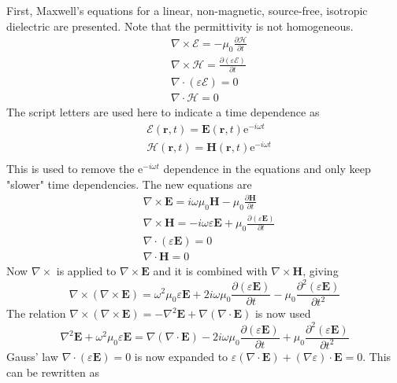 \documentclass[10pt,a4paper,draft]{scrartcl}
\begin{document}
	First, Maxwell's equations for a linear, non-magnetic, source-free, isotropic dielectric are presented. Note that the permittivity is not homogeneous.
	\begin{align*}
		&\nabla \times \bm{\mathcal{E}} = -\mu_0 \frac{\partial \bm{\mathcal{H}}}{\partial t} \\
		&\nabla \times \bm{\mathcal{H}} = \frac{\partial (\varepsilon \bm{\mathcal{E}})}{\partial t} \\
		&\nabla \cdot (\varepsilon \bm{\mathcal{E}}) = 0 \\
		&\nabla \cdot \bm{\mathcal{H}} = 0
	\end{align*}
	The script letters are used here to indicate a time dependence as
	\begin{align*}
		&\bm{\mathcal{E}}(\bm{r},t) = \bm{E}(\bm{r},t) \text{e}^{-i\omega t} \\
		&\bm{\mathcal{H}}(\bm{r},t) = \bm{H}(\bm{r},t) \text{e}^{-i\omega t} \\
	\end{align*}
	This is used to remove the e$^{-i\omega t}$ dependence in the equations and only keep "slower" time dependencies. The new equations are
	\begin{align*}
		&\nabla \times \bm{E} = i\omega \mu_0 \bm{H} - \mu_0 \frac{\partial \bm{H}}{\partial t} \\
		&\nabla \times \bm{H} = -i\omega \varepsilon \bm{E} + \mu_0 \frac{\partial (\varepsilon \bm{E})}{\partial t} \\
		&\nabla \cdot (\varepsilon \bm{E}) = 0 \\
		&\nabla \cdot \bm{H} = 0
	\end{align*}
	Now $\nabla \times$ is applied to $\nabla \times \bm{E}$ and it is combined with $\nabla \times \bm{H}$, giving
	\begin{equation*}
		\nabla \times (\nabla \times \bm{E}) = \omega^2 \mu_0 \varepsilon \bm{E} + 2i\omega \mu_0 \frac{\partial (\varepsilon \bm{E})}{\partial t} - \mu_0 \frac{\partial^2 (\varepsilon \bm{E})}{\partial t^2}
	\end{equation*}
	The relation $\nabla \times (\nabla \times \bm{E}) = -\nabla^2\bm{E} + \nabla(\nabla \cdot \bm{E})$ is now used
	\begin{equation*}
		\nabla^2\bm{E} + \omega^2 \mu_0 \varepsilon \bm{E} = \nabla(\nabla \cdot \bm{E}) - 2i\omega \mu_0 \frac{\partial (\varepsilon \bm{E})}{\partial t} + \mu_0 \frac{\partial^2 (\varepsilon \bm{E})}{\partial t^2}
	\end{equation*}
	Gauss' law $\nabla \cdot (\varepsilon \bm{E}) = 0$ is now expanded to $\varepsilon(\nabla \cdot \bm{E}) + (\nabla \varepsilon) \cdot \bm{E} = 0$. This can be rewritten as
\end{document}
